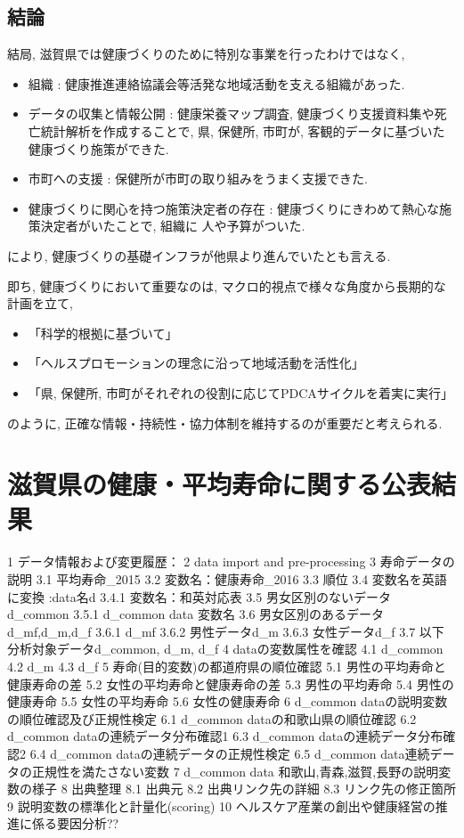 \section{結論}
結局, 滋賀県では健康づくりのために特別な事業を行ったわけではなく,
\begin{itemize} \setlength{\itemsep}{-0.5mm} \setlength{\parskip}{-0.5mm}
	\item 組織 :  健康推進連絡協議会等活発な地域活動を支える組織があった.
	\item データの収集と情報公開 : 健康栄養マップ調査, 健康づくり支援資料集や死亡統計解析を作成することで, 県, 保健所, 市町が, 客観的データに基づいた健康づくり施策ができた.
	\item 市町への支援 : 保健所が市町の取り組みをうまく支援できた.
	\item 健康づくりに関心を持つ施策決定者の存在 : 健康づくりにきわめて熱心な施策決定者がいたことで, 組織に 人や予算がついた.
\end{itemize}
により, 健康づくりの基礎インフラが他県より進んでいたとも言える.

即ち, 健康づくりにおいて重要なのは, マクロ的視点で様々な角度から長期的な計画を立て,
\begin{itemize} \setlength{\itemsep}{-0.5mm} \setlength{\parskip}{-0.5mm}
	\item 「科学的根拠に基づいて」
	\item 「ヘルスプロモーションの理念に沿って地域活動を活性化」
	\item 「県, 保健所, 市町がそれぞれの役割に応じてPDCAサイクルを着実に実行」
\end{itemize}
のように, 正確な情報・持続性・協力体制を維持するのが重要だと考えられる.


\chapter{滋賀県の健康・平均寿命に関する公表結果}

1 データ情報および変更履歴：
2 data import and pre-processing
3 寿命データの説明
3.1 平均寿命\_2015
3.2 変数名：健康寿命\_2016
3.3 順位
3.4 変数名を英語に変換 :data名d
3.4.1 変数名：和英対応表
3.5 男女区別のないデータ d\_common
3.5.1 d\_common data 変数名
3.6 男女区別のあるデータ d\_mf,d\_m,d\_f
3.6.1 d\_mf
3.6.2 男性データd\_m
3.6.3 女性データd\_f
3.7 以下分析対象データd\_common, d\_m, d\_f
4 dataの変数属性を確認
4.1 d\_common
4.2 d\_m
4.3 d\_f
5 寿命(目的変数)の都道府県の順位確認
5.1 男性の平均寿命と健康寿命の差
5.2 女性の平均寿命と健康寿命の差
5.3 男性の平均寿命
5.4 男性の健康寿命
5.5 女性の平均寿命
5.6 女性の健康寿命
6 d\_common dataの説明変数の順位確認及び正規性検定
6.1 d\_common dataの和歌山県の順位確認
6.2 d\_common dataの連続データ分布確認1
6.3 d\_common dataの連続データ分布確認2
6.4 d\_common dataの連続データの正規性検定
6.5 d\_common data連続データの正規性を満たさない変数
7 d\_common data 和歌山,青森,滋賀,長野の説明変数の様子
8 出典整理
8.1 出典元
8.2 出典リンク先の詳細
8.3 リンク先の修正箇所
9 説明変数の標準化と計量化(scoring)
10 ヘルスケア産業の創出や健康経営の推進に係る要因分析??


